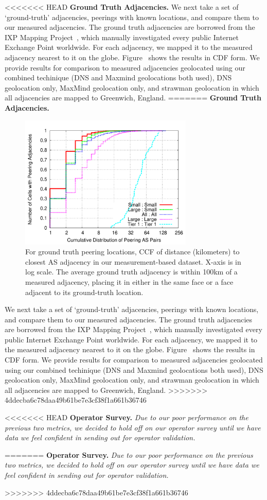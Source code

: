 {<<<<<<< HEAD
            {\bf Ground Truth Adjacencies.}
           We next take a set of `ground-truth' adjacencies, peerings with known locations, and compare them to our measured adjacencies. 
           The ground truth adjacencies are borrowed from the IXP Mapping Project~\cite{ixps-mapped}, which manually investigated every public Internet Exchange Point worldwide.
            For each adjacency, we mapped it to the measured adjacency nearest to it on the globe.
            Figure~\cite{fig:closestadjacency} shows the results in CDF form.
            We provide results for comparison to measured adjacencies geolocated using our combined techinique (DNS and Maxmind geolocations both used), DNS geolocation only, MaxMind geolocation only, and strawman geolocation in which all adjacencies are mapped to Greenwich, England.
=======
    {\bf Ground Truth Adjacencies.}
\begin{figure}[tb]
\centering
\includegraphics[width=3.25in]{graph_all_match}
\caption[]{\label{fig:closestadjacency} For ground truth peering locations, CCF
of distance (kilometers) to closest AS adjacency in our measurement-based
dataset. X-axis is in log scale. The average ground truth adjacency is within
100km of a measured adjacency, placing it in either in the same face or a face
adjacent to its ground-truth location.} 
\end{figure}
    We next take a set of `ground-truth' adjacencies, peerings with known
    locations, and compare them to our measured adjacencies.  The ground truth
    adjacencies are borrowed from the IXP Mapping Project~\cite{ixps-mapped},
    which manually investigated every public Internet Exchange Point worldwide.
    For each adjacency, we mapped it to the measured adjacency nearest to it on
    the globe.  Figure~\cite{fig:closestadjacency} shows the results in CDF
    form.  We provide results for comparison to measured adjacencies geolocated
    using our combined techinique (DNS and Maxmind geolocations both used), DNS
    geolocation only, MaxMind geolocation only, and strawman geolocation in
    which all adjacencies are mapped to Greenwich, England.   
>>>>>>> 4ddecba6c78daa49b61be7e3cf38f1a661b36746




<<<<<<< HEAD
            {\bf Operator Survey.} {\it Due to our poor performance on the previous two metrics, we decided to hold off on our operator survey until we have data we feel confident in sending out for operator validation.}
}
=======
    {\bf Operator Survey.} {\it Due to our poor performance on the previous two
    metrics, we decided to hold off on our operator survey until we have data
    we feel confident in sending out for operator validation.}

>>>>>>> 4ddecba6c78daa49b61be7e3cf38f1a661b36746


